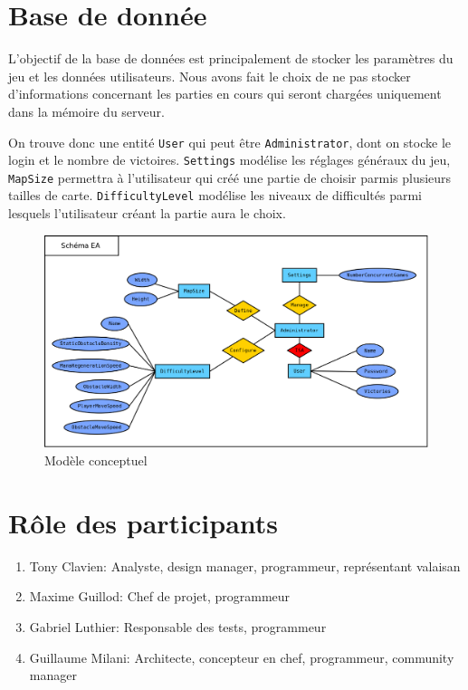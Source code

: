 \documentclass[a4paper,11pt]{article}
\begin{document}
	\section{Base de donnée}
	L'objectif de la base de données est principalement de stocker les paramètres du jeu et les données utilisateurs. Nous avons fait le choix de ne pas stocker d'informations concernant les parties en cours qui seront chargées uniquement dans la mémoire du serveur. \par

	On trouve donc une entité \texttt{User} qui peut être \texttt{Administrator}, dont on stocke le login et le nombre de victoires. \texttt{Settings} modélise les réglages généraux du jeu, \texttt{MapSize} permettra à l'utilisateur qui créé une partie de choisir parmis plusieurs tailles de carte. \texttt{DifficultyLevel} modélise les niveaux de difficultés parmi lesquels l'utilisateur créant la partie aura le choix.
	\begin{figure}[ht]
		\centering
		\includegraphics[width=\textwidth]{../Database/ER_diagram.png}
		\caption{Modèle conceptuel}
		\label{database_er}
	\end{figure}

	\section{Rôle des participants}
		\begin{enumerate}
			\item Tony Clavien: Analyste, design manager, programmeur, représentant valaisan
			\item Maxime Guillod: Chef de projet, programmeur
			\item Gabriel Luthier: Responsable des tests, programmeur
			\item Guillaume Milani: Architecte, concepteur en chef, programmeur, community manager
		\end{enumerate}
\end{document}
